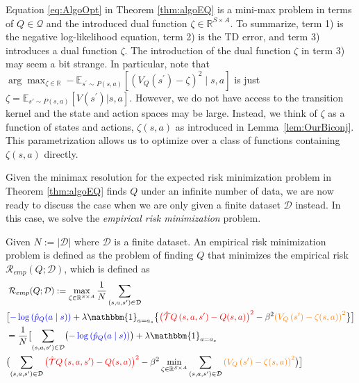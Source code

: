 \noindent Equation \eqref{eq:AlgoOpt} in Theorem \ref{thm:algoEQ} is a mini-max problem in terms of $Q\in\mathcal{Q}$ and the introduced dual function $\zeta\in \mathbb{R}^{S\times A}$. To summarize, term 1) is the negative log-likelihood equation, term 2) is the TD error, and term 3) introduces a dual function $\zeta$.
The introduction of the dual function $\zeta$ in term 3) may seem a bit strange. 
In particular, note that $\arg\max_{\zeta \in \mathbb{R}} -\mathbb{E}_{s^{\prime} \sim P(s, a)}\left[\left(V_Q\left(s^{\prime}\right)-\zeta\right)^2 \mid s, a\right]$ is just $\zeta = \mathbb{E}_{s'\sim P(s,a)}[V\left(s^{\prime}\right)|s,a]$. 
However, we do not have access to the transition kernel and the state and action spaces may be large. 
Instead, we think of $\zeta$ as a function of states and actions, $\zeta(s,a)$ as introduced in Lemma~\ref{lem:OurBiconj}. This parametrization allows us to optimize over a class of functions containing $\zeta(s,a)$ directly. 

Given the minimax resolution for the expected risk minimization problem in Theorem \ref{thm:algoEQ} finds $Q$ under an infinite number of data, we are now ready to discuss the case when we are only given a finite dataset $\mathcal{D}$ instead. In this case, we solve the \textit{empirical risk minimization} problem.

\begin{defn}
\label{def:ERM}
Given $N := |\mathcal{D}|$ where $\mathcal{D}$ is a finite dataset. An empirical risk minimization problem is defined as the problem of finding $Q$ that minimizes the empirical risk $\mathcal{R}_{emp}(Q;\mathcal{D})$, which is defined as
\begin{align}
     &\;\mathcal{R}_{emp}(Q;\mathcal{D}):=\max_{\zeta\in \mathbb{R}^{S\times A}}\frac{1}{N}  \sum_{(s,a,s^\prime)\in \mathcal{D}}\notag
    \\
    &\bigl[\textcolor{blue}{-\log \left(\hat{p}_Q(a \mid s)\right)} + 
   \lambda\mathbbm{1}_{a=a_s}\bigl\{\textcolor{red}{\bigl(\hat{\mathcal{T}} Q\left(s, a, s^{\prime}\right)-Q(s, a)\bigr)^2} -\beta^2  \textcolor{orange}{\left(V_{Q}\left(s^{\prime}\right)-\zeta(s,a)\right)^2} \bigr\} \bigr]\notag
   \\
   &= \frac{1}{N}\bigl[\sum_{(s,a,s^\prime)\in \mathcal{D}}\bigl(\textcolor{blue}{-\log \left(\hat{p}_Q(a \mid s)\right)}\bigr)+ 
\lambda\mathbbm{1}_{a=a_s}\notag
    \\
    &\bigl(  \sum_{(s,a,s^\prime)\in \mathcal{D}} \textcolor{red}{\bigl(\hat{\mathcal{T}} Q\left(s, a, s^{\prime}\right)-Q(s, a)\bigr)^2}  -\beta^2 \min_{\zeta\in \mathbb{R}^{S\times A}} 
   \sum_{(s,a,s^\prime)\in \mathcal{D}} \textcolor{orange}{\left(V_{Q}\left(s^{\prime}\right)-\zeta(s,a)\right)^2}\bigr) \bigr] \label{eq:EmpiricalERMIRL}
\end{align}
\end{defn}

